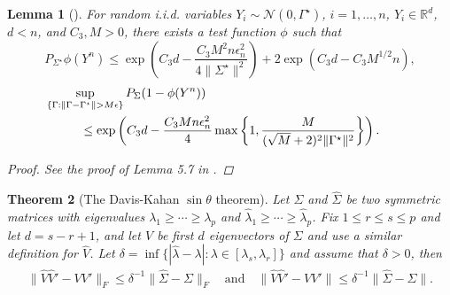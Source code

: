 \documentclass[pdftex, noinfoline, letter]{imsart}
\theoremstyle{plain}
\newtheorem{theorem}{Theorem}[section]
\newtheorem{lemma}[theorem]{Lemma}
\begin{document}
\begin{lemma}[\citet{gao15}]
\label{apx-test}
For random i.i.d. variables $Y_i \sim \mathcal{N}(0, \Gamma^\star)$, $i = 1, \dots, n$, $Y_i \in \mathbb{R}^d$, $d < n$, and $C_3, M > 0$, there exists a test function $\phi$ such that 
$$P_{\Sigma^\star} \phi(Y^n) 
    \leq \exp\left(C_3 d - \frac{C_3M^2 n\epsilon_n^2}{4 \|\Sigma^\star\|^2}\right)
    + 2\exp(C_3d - C_3M^{1/2}n),$$
 \begin{align*}
 	&\hspace{-1cm} \sup_{\{\Gamma: \|\Gamma - \Gamma^\star\| > M\epsilon\}}
 	P_{\Sigma} (1 - \phi(Y^n))\\
 	&\leq \exp
 	\left(
 	C_3d - \frac{C_3 Mn\epsilon_n^2}{4}
 	\max\left\{
 	1, \frac{M}{(\sqrt{M} + 2)^2 \|\Gamma^\star\|^2}
 	\right\}
 	\right).
 \end{align*}
\begin{proof}
See the proof of Lemma 5.7 in \citet{gao15}.
\end{proof}
\end{lemma}

\begin{theorem}[The Davis-Kahan $\sin \theta$ theorem]
\label{apx-davis-kahan}
Let $\Sigma$ and $\widehat\Sigma$ be two symmetric matrices with eigenvalues $\lambda_1 \geq \cdots \geq \lambda_p$ and $\widehat\lambda_1 \geq \cdots \geq \widehat\lambda_p$. Fix $1 \leq r \leq s \leq p$ and let $d = s-r+1$,
and let $V$ be first $d$ eigenvectors of $\Sigma$ and use a similar definition for $\widehat V$. Let $\delta = \inf\{|\widehat\lambda - \lambda|: \lambda \in [\lambda_s, \lambda_r]\}$ and assume that $\delta > 0$,
then 
\begin{align*}
    \|\widehat V\widehat V' - VV' \|_F  \leq \delta^{-1} \|\widehat\Sigma - \Sigma\|_F\quad\text{and}\quad
    \|\widehat V\widehat V' - VV' \| \leq \delta^{-1} \|\widehat\Sigma - \Sigma\|.
\end{align*}
\end{theorem}
\end{document}
